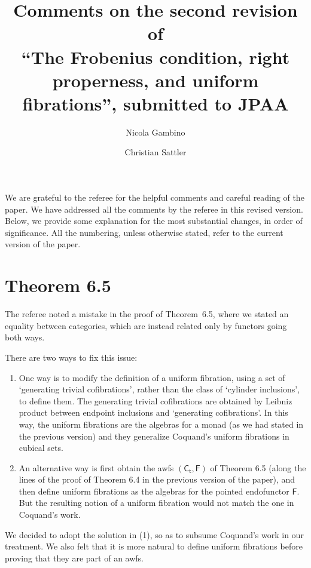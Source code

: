 \documentclass[reqno,10pt,a4paper,oneside,draft]{amsart}
\begin{document}
\title[Second revision]{Comments on the second revision of \\ ``The Frobenius condition, right properness, and uniform fibrations'', submitted to JPAA}

\author{Nicola Gambino \and Christian Sattler} 

\maketitle

We are grateful to the referee for the helpful comments and careful reading of the paper. We have addressed all the comments by the referee in this revised version.  Below, we provide some explanation for the most substantial changes, in order of significance. All the numbering, unless otherwise stated, refer to the current version of the paper.


\section*{Theorem 6.5} 

The referee noted a mistake in the proof of Theorem~6.5, where we stated an equality between categories, which are
instead related only by functors going both ways.  

There are two ways to fix this issue: 

\begin{enumerate} 
\item One way is to modify the definition of a uniform fibration, using a set of `generating trivial cofibrations', rather than the class of `cylinder inclusions', to define them. The generating trivial cofibrations are obtained by Leibniz product between endpoint inclusions and `generating cofibrations'.  In this way, the uniform fibrations are the algebras for a monad (as we had stated in the previous version) and they generalize Coquand's uniform fibrations in cubical sets. 
\item  An alternative way is first obtain the awfs $(\mathsf{C_t}, \mathsf{F})$ of Theorem 6.5 (along the lines of the proof of Theorem 6.4 in the previous version of the paper), and then define uniform fibrations as the algebras for the pointed endofunctor $\mathsf{F}$.
But the resulting notion of a uniform fibration would not match the one in Coquand's work.
\end{enumerate} 

We decided to adopt the solution in (1), so as to subsume Coquand's work in our treatment. We also felt that it is more natural
to define uniform fibrations before proving that they are part of an awfs. 
\end{document}
